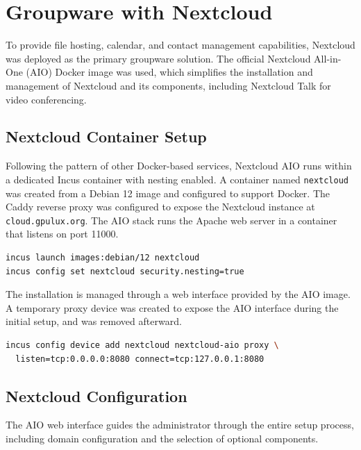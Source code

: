 \section{Groupware with Nextcloud}

To provide file hosting, calendar, and contact management capabilities, Nextcloud was deployed as the primary groupware solution. The official Nextcloud All-in-One (AIO) Docker image\cite{nextcloud-aio} was used, which simplifies the installation and management of Nextcloud and its components, including Nextcloud Talk for video conferencing.

\subsection*{Nextcloud Container Setup}

Following the pattern of other Docker-based services, Nextcloud AIO runs within a dedicated Incus container with nesting enabled. A container named \texttt{nextcloud} was created from a Debian 12 image and configured to support Docker. The Caddy reverse proxy was configured to expose the Nextcloud instance at \texttt{cloud.gpulux.org}. The AIO stack runs the Apache web server in a container that listens on port 11000.

\begin{lstlisting}[language=bash,caption={Commands to create and configure the Nextcloud container}]
incus launch images:debian/12 nextcloud
incus config set nextcloud security.nesting=true
\end{lstlisting}

The installation is managed through a web interface provided by the AIO image. A temporary proxy device was created to expose the AIO interface during the initial setup, and was removed afterward.

\begin{lstlisting}[language=bash,caption={Commands to temporarily expose the Nextcloud AIO setup interface}]
incus config device add nextcloud nextcloud-aio proxy \
  listen=tcp:0.0.0.0:8080 connect=tcp:127.0.0.1:8080
\end{lstlisting}

\subsection*{Nextcloud Configuration}

The AIO web interface guides the administrator through the entire setup process, including domain configuration and the selection of optional components.

